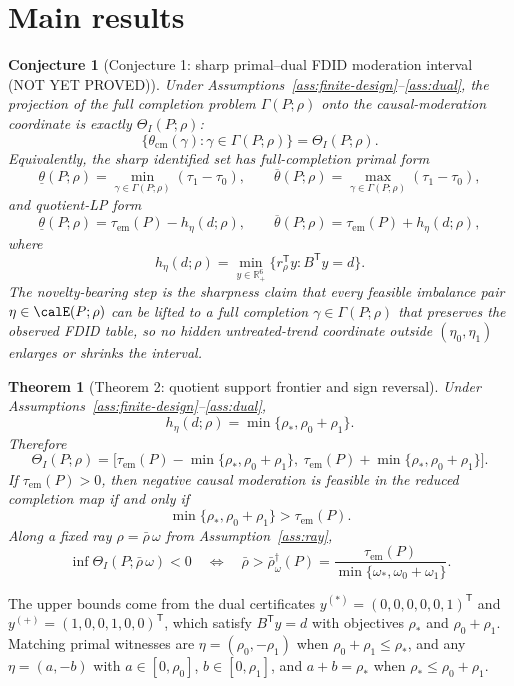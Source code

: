 \documentclass[11pt]{article}
\newcommand{\transpose}{\mathsf{T}}
\newcommand{\R}{\mathbb{R}}
\theoremstyle{definition}
\theoremstyle{plain}
\newtheorem{theorem}{Theorem}
\newtheorem{conjecture}{Conjecture}
\theoremstyle{remark}
\begin{document}
\section{Main results}
\begin{conjecture}[Conjecture 1: sharp primal--dual FDID moderation interval {\normalfont (NOT YET PROVED)}]\label{conj:lp-dual}
Under Assumptions~\ref{ass:finite-design}--\ref{ass:dual}, the projection of the full completion problem \(\Gamma(P;\rho)\) onto the causal-moderation coordinate is exactly \(\Theta_I(P;\rho)\):
\[
\{\theta_{\mathrm{cm}}(\gamma):\gamma\in\Gamma(P;\rho)\}
=
\Theta_I(P;\rho).
\]
Equivalently, the sharp identified set has full-completion primal form
\[
\underline\theta(P;\rho)
=
\min_{\gamma\in\Gamma(P;\rho)}(\tau_1-\tau_0),
\qquad
\overline\theta(P;\rho)
=
\max_{\gamma\in\Gamma(P;\rho)}(\tau_1-\tau_0),
\]
and quotient-LP form
\[
\underline\theta(P;\rho)
=
\tau_{\mathrm{em}}(P)-h_\eta(d;\rho),
\qquad
\overline\theta(P;\rho)
=
\tau_{\mathrm{em}}(P)+h_\eta(d;\rho),
\]
where
\[
h_\eta(d;\rho)
=
\min_{y\in\R_+^6}\{r_\rho^\transpose y:B^\transpose y=d\}.
\]
The novelty-bearing step is the sharpness claim that every feasible imbalance pair \(\eta\in\calE(P;\rho)\) can be lifted to a full completion \(\gamma\in\Gamma(P;\rho)\) that preserves the observed FDID table, so no hidden untreated-trend coordinate outside \((\eta_0,\eta_1)\) enlarges or shrinks the interval.
\end{conjecture}

\begin{theorem}[Theorem 2: quotient support frontier and sign reversal]\label{thm:support}
Under Assumptions~\ref{ass:finite-design}--\ref{ass:dual},
\[
h_\eta(d;\rho)=\min\{\rho_\ast,\rho_0+\rho_1\}.
\]
Therefore
\[
\Theta_I(P;\rho)=
\Big[\tau_{\mathrm{em}}(P)-\min\{\rho_\ast,\rho_0+\rho_1\},\
\tau_{\mathrm{em}}(P)+\min\{\rho_\ast,\rho_0+\rho_1\}\Big].
\]
If \(\tau_{\mathrm{em}}(P)>0\), then negative causal moderation is feasible in the reduced completion map if and only if
\[
\min\{\rho_\ast,\rho_0+\rho_1\}>\tau_{\mathrm{em}}(P).
\]
Along a fixed ray \(\rho=\bar\rho\,\omega\) from Assumption~\ref{ass:ray},
\[
\inf\Theta_I(P;\bar\rho\,\omega)<0
\quad\Longleftrightarrow\quad
\bar\rho>\bar\rho^\dagger_\omega(P)
=
\frac{\tau_{\mathrm{em}}(P)}{\min\{\omega_\ast,\omega_0+\omega_1\}}.
\]
\end{theorem}
The upper bounds come from the dual certificates \(y^{(\ast)}=(0,0,0,0,0,1)^\transpose\) and \(y^{(+)}=(1,0,0,1,0,0)^\transpose\), which satisfy \(B^\transpose y=d\) with objectives \(\rho_\ast\) and \(\rho_0+\rho_1\). Matching primal witnesses are \(\eta=(\rho_0,-\rho_1)\) when \(\rho_0+\rho_1\le \rho_\ast\), and any \(\eta=(a,-b)\) with \(a\in[0,\rho_0]\), \(b\in[0,\rho_1]\), and \(a+b=\rho_\ast\) when \(\rho_\ast\le \rho_0+\rho_1\).
\end{document}
